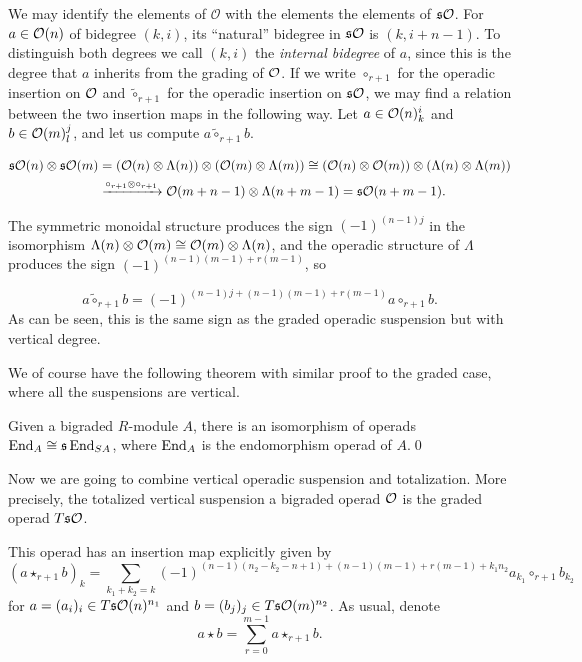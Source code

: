\documentclass[twoside]{article}
\begin{document}
We may identify the elements of $\mathcal{O}$ with the elements the elements of $\mathfrak{s}{\mathcal O}$. For $a\in{\mathcal O}(n)$ of bidegree $(k,i)$, its ``natural'' bidegree in $\mathfrak{s}{\mathcal O}$ is $(k,i+n-1)$. To distinguish both degrees we call $(k,i)$ the \emph{internal bidegree} of $a$, since this is the degree that $a$ inherits from the grading of ${\mathcal O}$. If we write $\circ_{r+1}$ for the operadic insertion on ${\mathcal O}$ and $\tilde{\circ}_{r+1}$ for the operadic insertion on $\mathfrak{s}{\mathcal O}$, we may find a relation between the two insertion maps in the following way. Let $a\in{\mathcal O}(n)^i_k$ and $b\in{\mathcal O}(m)^j_l$, and let us compute $a\tilde{\circ}_{r+1} b$.

\begin{align*}
\mathfrak{s}{\mathcal O}(n)\otimes\mathfrak{s}{\mathcal O}(m)&=({\mathcal O}(n)\otimes\Lambda(n))\otimes ({\mathcal O}(m)\otimes\Lambda(m))\cong ({\mathcal O}(n)\otimes {\mathcal O}(m))\otimes (\Lambda(n)\otimes \Lambda(m))\\
&\xrightarrow{\circ_{r+1}\otimes\circ_{r+1}} {\mathcal O}(m+n-1)\otimes \Lambda(n+m-1)=\mathfrak{s}{\mathcal O}(n+m-1).
\end{align*}

The symmetric monoidal structure produces the sign $(-1)^{(n-1)j}$ in the isomorphism $\Lambda(n)\otimes {\mathcal O}(m)\cong{\mathcal O}(m)\otimes\Lambda(n)$, and the operadic structure of $\Lambda$ produces the sign $(-1)^{(n-1)(m-1)+r(m-1)}$, so 

\begin{equation}\label{sign}
a\tilde{\circ}_{r+1}b=(-1)^{(n-1)j+(n-1)(m-1)+r(m-1)}a\circ_{r+1} b.
\end{equation}
As can be seen, this is the same sign as the graded operadic suspension but with vertical degree.

We of course have the following theorem with similar proof to the graded case, where all the suspensions are vertical.
\begin{thm}\label{markl}
Given a bigraded $R$-module $A$, there is an isomorphism of operads $\operatorname{End}_{ A}\cong \mathfrak{s}\operatorname{End}_{SA}$, where $\operatorname{End}_A$ is the endomorphism operad of $A$.\qed
\end{thm}

 

Now we are going to combine vertical operadic suspension and totalization. More precisely, the totalized vertical suspension a bigraded operad ${\mathcal O}$ is the graded operad $T\mathfrak{s}{\mathcal O}$. 


This operad has an insertion map explicitly given by
\[(a\star_{r+1} b)_k=\sum_{k_1+k_2=k}(-1)^{(n-1)(n_2-k_2-n+1)+(n-1)(m-1)+r(m-1)+k_1n_2}a_{k_1}\circ_{r+1}b_{k_2}\]
for $a=(a_i)_i\in T\mathfrak{s}{\mathcal O}(n)^{n_1}$ and $b=(b_j)_j\in T\mathfrak{s}{\mathcal O}(m)^{n_2}$. As usual, denote \[a\star b=\sum_{r=0}^{m-1}a\star_{r+1}b.\]
\end{document}
